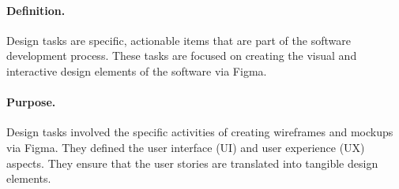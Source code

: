 \documentclass[multi, tikz, a4paper, oneside]{article}
\begin{document}
\paragraph{Definition.}
Design tasks are specific, actionable items that are part of the software
development process. These tasks are focused on creating the visual and
interactive design elements of the software via Figma.

\paragraph{Purpose.}
Design tasks involved the specific activities of creating wireframes and mockups
via Figma. They defined the user interface (UI) and user experience (UX)
aspects. They ensure that the user stories are translated into tangible design
elements.
\end{document}
